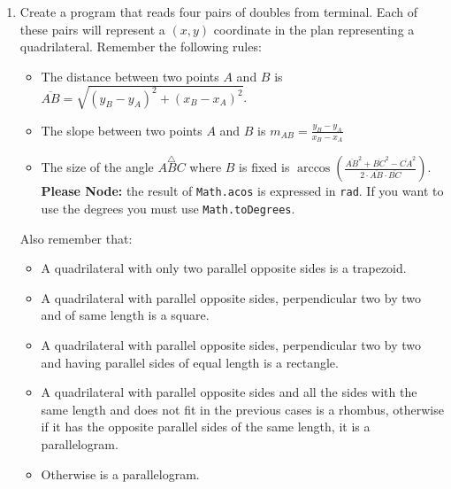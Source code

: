 \documentclass[]{scrartcl}
\begin{document}
\begin{enumerate}
\item Create a program that reads four pairs of doubles from terminal. Each of these pairs will represent a $(x, y)$ coordinate in the plan representing a quadrilateral. Remember the following rules:
\begin{itemize}
	\item The distance between two points $A$ and $B$ is $\overline{AB}=\sqrt{(y_B-y_A)^2+(x_B-x_A)^2}$.
	\item The slope between two points $A$ and $B$ is $m_{AB}=\frac{y_B-y_A}{x_B-x_A}$
	\item The size of the angle $\stackrel{\bigtriangleup}{ABC}$ where $B$ is fixed is $\arccos\left(\frac{\overline{AB}^2+\overline{BC}^2-\overline{CA}^2}{2\cdot \overline{AB}\cdot \overline{BC}}\right)$. \textbf{Please Node:} the result of \texttt{Math.acos} is expressed in \texttt{rad}. If you want to use the degrees you must use \texttt{Math.toDegrees}.
\end{itemize}
Also remember that:
\begin{itemize}
\item A quadrilateral with only two parallel opposite sides is a trapezoid.
\item A quadrilateral with parallel opposite sides, perpendicular two by two and of same length is a square.
\item A quadrilateral with parallel opposite sides, perpendicular two by two and having parallel sides of equal length is a rectangle.
\item A quadrilateral with parallel opposite sides and all the sides with the same length and does not fit in the previous cases is a rhombus, otherwise if it has the opposite parallel sides of the same length, it is a parallelogram.
\item Otherwise is a parallelogram.
\end{itemize}
\end{enumerate}
\end{document}
